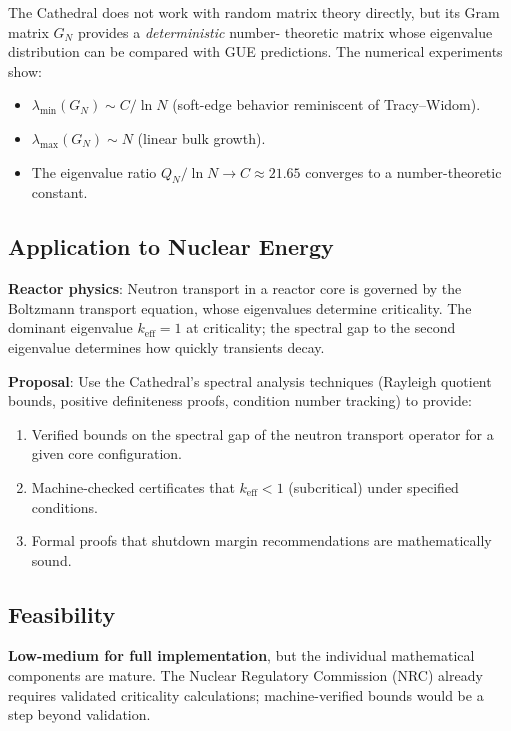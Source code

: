 \documentclass[11pt,a4paper]{article}
\begin{document}
The Cathedral does not work with random matrix theory directly,
but its Gram matrix $G_N$ provides a \emph{deterministic} number-
theoretic matrix whose eigenvalue distribution can be compared with
GUE predictions. The numerical experiments show:

\begin{itemize}
  \item $\lambda_{\min}(G_N) \sim C / \ln N$ (soft-edge behavior
    reminiscent of Tracy--Widom).
  \item $\lambda_{\max}(G_N) \sim N$ (linear bulk growth).
  \item The eigenvalue ratio $Q_N / \ln N \to C \approx 21.65$
    converges to a number-theoretic constant.
\end{itemize}

\subsection{Application to Nuclear Energy}

\textbf{Reactor physics}: Neutron transport in a reactor core is
governed by the Boltzmann transport equation, whose eigenvalues
determine criticality. The dominant eigenvalue $k_{\text{eff}} = 1$
at criticality; the spectral gap to the second eigenvalue determines
how quickly transients decay.

\textbf{Proposal}: Use the Cathedral's spectral analysis techniques
(Rayleigh quotient bounds, positive definiteness proofs, condition
number tracking) to provide:

\begin{enumerate}
  \item Verified bounds on the spectral gap of the neutron transport
    operator for a given core configuration.
  \item Machine-checked certificates that $k_{\text{eff}} < 1$
    (subcritical) under specified conditions.
  \item Formal proofs that shutdown margin recommendations are
    mathematically sound.
\end{enumerate}

\subsection{Feasibility}

\textbf{Low-medium for full implementation}, but the individual
mathematical components are mature. The Nuclear Regulatory
Commission (NRC) already requires validated criticality calculations;
machine-verified bounds would be a step beyond validation.
\end{document}
